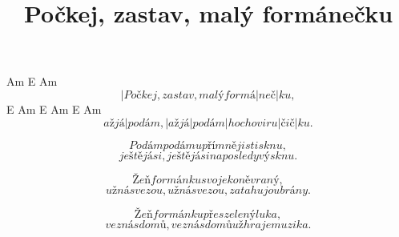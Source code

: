 \documentclass{song}
\title{Počkej, zastav, malý formánečku}
\begin{document}
\strophe
   Am                         E   Am
\[ |Počkej, zastav, malý formá|neč|ku, \]
         E       Am     E      Am         E   Am
\[ až já |podám, |až já |podám |hochovi ru|čič|ku. \]
\endstrophe

\strophe*
\[ Podám podám upřímně ji stisknu, \]
\[ ještě já si, ještě já si naposledy výsknu. \]
\endstrophe

\strophe*
\[ Žeň formánku svoje koně vraný, \]
\[ už nás vezou, už nás vezou, zatahujou brány. \]
\endstrophe

\strophe*
\[ Žeň formánku přes zelený luka, \]
\[ vez nás domů, vez nás domů už hraje muzika. \]
\endstrophe
\end{document}
